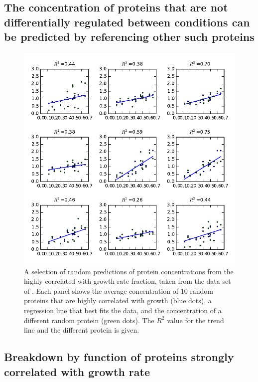 \documentclass[a4paper]{article}
\begin{document}
\subsection{The concentration of proteins that are not differentially regulated between conditions can be predicted by referencing other such proteins}

\begin{figure}[H]
\begin{center}
\includegraphics[width=1\columnwidth]{RandEstimateHeinemann.pdf}
\caption{\label{fig:randpred}
  A selection of random predictions of protein concentrations from the highly correlated with growth rate fraction, taken from the data set of \cite{Heinemann2015}.
  Each panel shows the average concentration of 10 random proteins that are highly correlated with growth (blue dots), a regression line that best fits the data, and the concentration of a different random protein (green dots).
  The $R^2$ value for the trend line and the different protein is given.
}
\end{center}
\end{figure}

\subsection{Breakdown by function of proteins strongly correlated with growth rate}
\end{document}
